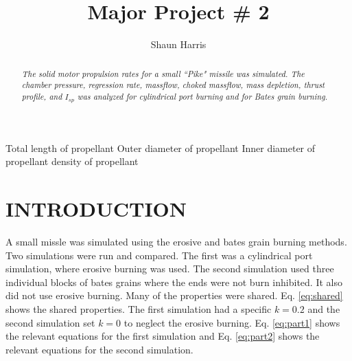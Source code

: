 \documentclass[cleanfoot,cleanhead,twocolumn,10pt,notitlepage]{asme2e}
\title{Major Project \# 2}
\author{Shaun Harris
    \affiliation{
	Department of Mechanical and Aerospace Engineering\\
	Utah State University \\
    Email: shaun.r.harris@gmail.com
    }
}
\begin{document}
\maketitle    


\begin{abstract}
    {\it The solid motor propulsion rates for a small ``Pike" missile was simulated.  The chamber pressure, regression rate, massflow, choked massflow, mass depletion, thrust profile, and $I_{sp}$ was analyzed for cylindrical port burning and for Bates grain burning.}
\end{abstract}


\tableofcontents


\begin{nomenclature}
     {Total length of propellant}
     {Outer diameter of propellant}
     {Inner diameter of propellant}
     {density of propellant}
\end{nomenclature}

\section{INTRODUCTION}

A small missle was simulated using the erosive and bates grain burning methods.  Two simulations were run and compared.  The first was a cylindrical port simulation, where erosive burning was used.  The second simulation used three individual blocks of bates grains where the ends were not burn inhibited.  It also did not use erosive burning.  Many of the properties were shared.  Eq. \ref{eq:shared} shows the shared properties.  The first simulation had a specific $k=0.2$ and the second simulation set $k=0$ to neglect the erosive burning.  Eq. \ref{eq:part1} shows the relevant equations for the first simulation and Eq. \ref{eq:part2} shows the relevant equations for the second simulation.
\end{document}
